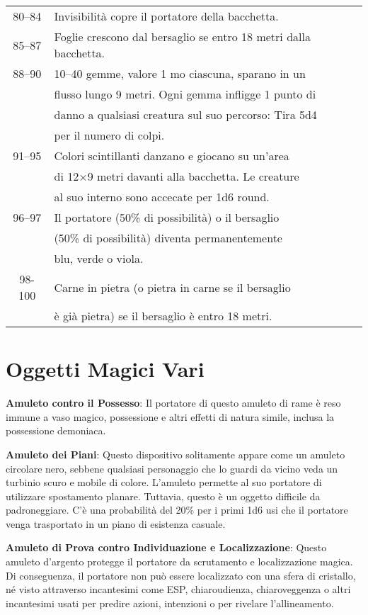 \documentclass{article}
\begin{document}
\begin{multicols}{2}
\begin{table}[h]
\begin{tabular}{|c|l|}
80–84 & Invisibilità copre il portatore della bacchetta. \\
85–87 & Foglie crescono dal bersaglio se entro 18 metri dalla bacchetta. \\
88–90 & 10–40 gemme, valore 1 mo ciascuna, sparano in un \\
& flusso lungo 9 metri. Ogni gemma infligge 1 punto di \\
& danno a qualsiasi creatura sul suo percorso: Tira 5d4 \\
& per il numero di colpi. \\
91–95 & Colori scintillanti danzano e giocano su un'area \\
& di 12×9 metri davanti alla bacchetta. Le creature \\
& al suo interno sono accecate per 1d6 round. \\
96–97 & Il portatore (50\% di possibilità) o il bersaglio \\
& (50\% di possibilità) diventa permanentemente \\
& blu, verde o viola. \\
98-100 & Carne in pietra (o pietra in carne se il bersaglio \\
& è già pietra) se il bersaglio è entro 18 metri. \\
\hline
\end{tabular}

\end{table}

\section{Oggetti Magici Vari}

\textbf{Amuleto contro il Possesso}: Il portatore di questo amuleto di rame è reso immune a vaso magico, possessione e altri effetti di natura simile, inclusa la possessione demoniaca.

\textbf{Amuleto dei Piani}: Questo dispositivo solitamente appare come un amuleto circolare nero, sebbene qualsiasi personaggio che lo guardi da vicino veda un turbinio scuro e mobile di colore. L'amuleto permette al suo portatore di utilizzare spostamento planare. Tuttavia, questo è un oggetto difficile da padroneggiare. C'è una probabilità del 20\% per i primi 1d6 usi che il portatore venga trasportato in un piano di esistenza casuale.

\textbf{Amuleto di Prova contro Individuazione e Localizzazione}: Questo amuleto d'argento protegge il portatore da scrutamento e localizzazione magica. Di conseguenza, il portatore non può essere localizzato con una sfera di cristallo, né visto attraverso incantesimi come ESP, chiaroudienza, chiaroveggenza o altri incantesimi usati per predire azioni, intenzioni o per rivelare l'allineamento.


\end{multicols}
\end{document}
